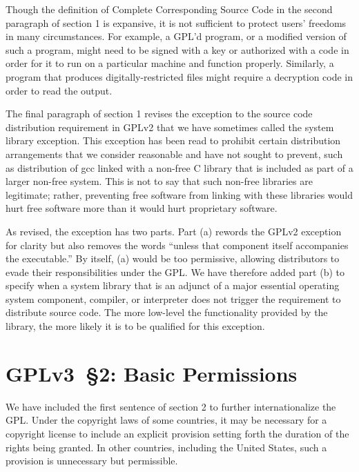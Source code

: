 Though the definition of Complete Corresponding Source Code in the
second paragraph of section 1 is expansive, it is not sufficient to
protect users' freedoms in many circumstances.  For example, a GPL'd
program, or a modified version of such a program, might need to be
signed with a key or authorized with a code in order for it to run on
a particular machine and function properly. Similarly, a program that
produces digitally-restricted files might require a decryption code in
order to read the output.  



The final paragraph of section 1 revises the exception to the source code
distribution requirement in GPLv2 that we have sometimes called the system
library exception. This exception has been read to prohibit certain
distribution arrangements that we consider reasonable and have not sought to
prevent, such as distribution of gcc linked with a non-free C library that is
included as part of a larger non-free system. This is not to say that such
non-free libraries are legitimate; rather, preventing free software from
linking with these libraries would hurt free software more than it would hurt
proprietary software.

As revised, the exception has two parts. Part (a) rewords the GPLv2
exception for clarity but also removes the words ``unless that
component itself accompanies the executable.''  By itself, (a) would
be too permissive, allowing distributors to evade their
responsibilities under the GPL.  We have therefore added part (b) to
specify when a system library that is an adjunct of a major essential
operating system component, compiler, or interpreter does not trigger
the requirement to distribute source code.  The more low-level the
functionality provided by the library, the more likely it is to be
qualified for this exception.

\section{GPLv3~\S2: Basic Permissions}


We have included the first sentence of section 2 to further internationalize
the GPL. Under the copyright laws of some countries, it may be necessary for
a copyright license to include an explicit provision setting forth the
duration of the rights being granted. In other countries, including the
United States, such a provision is unnecessary but permissible.

